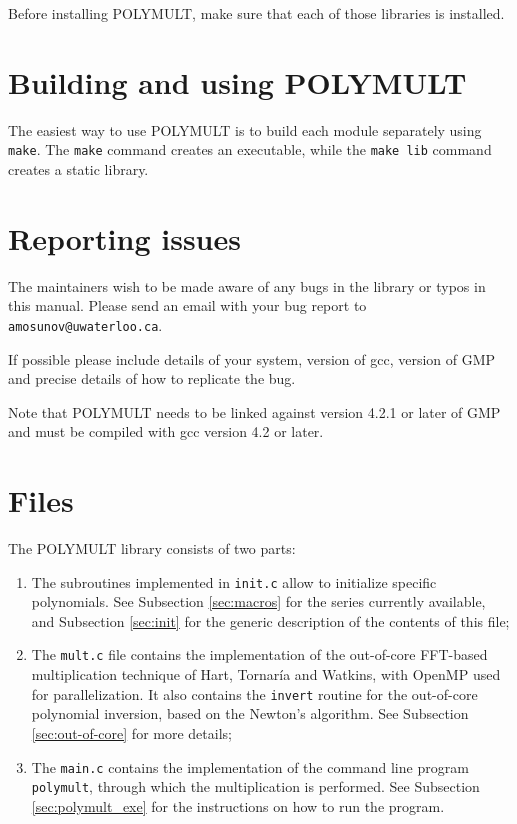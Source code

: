 \documentclass[a4paper,10pt]{article}
\newcommand{\code}{\lstinline}
\begin{document}
Before installing POLYMULT, make sure that each of those libraries is installed.





\section{Building and using POLYMULT}

The easiest way to use POLYMULT is to build each module separately using \code{make}. The \code{make} command creates an executable, while the \code{make lib} command creates a static library.




\section{Reporting issues}

The maintainers wish to be made aware of any bugs in the library or typos in this manual. Please send an email with your bug report to \code{amosunov@uwaterloo.ca}.

If possible please include details of your system, version of gcc, version of GMP and precise details of how to replicate the bug.

Note that POLYMULT needs to be linked against version 4.2.1 or later of GMP and must be compiled with gcc version 4.2 or later.





\section{Files}

The POLYMULT library consists of two parts:

\begin{enumerate}
\item The subroutines implemented in \code{init.c} allow to initialize specific polynomials. See Subsection \ref{sec:macros} for the series currently available, and Subsection \ref{sec:init} for the generic description of the contents of this file;

\item The \code{mult.c} file contains the implementation of the out-of-core FFT-based multiplication technique of Hart, Tornar\'ia and Watkins, with OpenMP used for parallelization. It also contains the \code{invert} routine for the out-of-core polynomial inversion, based on the Newton's algorithm. See Subsection \ref{sec:out-of-core} for more details;

\item The \code{main.c} contains the implementation of the command line program \code{polymult}, through which the multiplication is performed. See Subsection \ref{sec:polymult_exe} for the instructions on how to run the program.
\end{enumerate}
\end{document}

